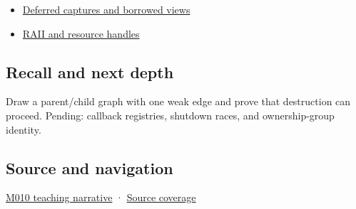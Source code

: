 \begin{itemize}
\tightlist
\item
  \hyperref[appendix-aea529eb5175]{Deferred captures and borrowed views}
\item
  \hyperref[appendix-69739d3ab49b]{RAII and resource handles}
\end{itemize}

\subsection{Recall and next depth}\label{appendix-b9548675eb2b-recall-and-next-depth}

Draw a parent/child graph with one weak edge and prove that destruction can proceed. Pending: callback registries, shutdown races, and ownership-group identity.

\subsection{Source and navigation}\label{appendix-b9548675eb2b-source-and-navigation}

\hyperref[01-foundations-i-ch004-weak-observation-breaks-cycles-without-pretending-an-object-is-alive]{M010 teaching narrative} · \hyperref[appendix-fd090d982a15-m010---parts-148-160]{Source coverage}
